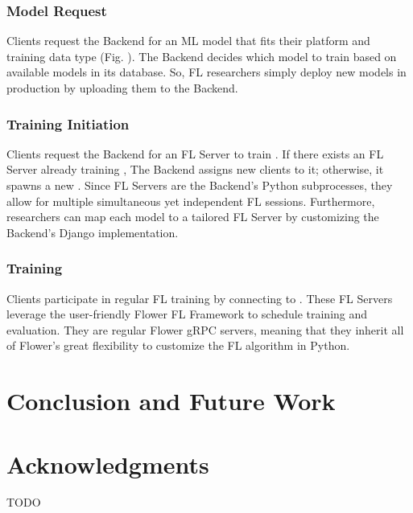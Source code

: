 \documentclass[letterpaper]{article} %
\begin{document}
\subsubsection{Model Request}
Clients request the Backend for an ML model \model{} that fits
their platform and training data type (Fig. ). %
The Backend decides which model to train based on
available models in its database.
So, FL researchers simply deploy new models in production by uploading them to
the Backend.

\subsubsection{Training Initiation}
Clients request the Backend for an FL Server \fs{} to train \model.
If there exists an FL Server already training \model,
The Backend assigns new clients to it;
otherwise, it spawns a new \fs.
Since FL Servers are the Backend's Python subprocesses,
they allow for multiple simultaneous yet independent FL sessions.
Furthermore, researchers can map each model to a tailored FL Server by
customizing the Backend's Django implementation.

\subsubsection{Training}
Clients participate in regular FL training by connecting to \fs.
These FL Servers leverage the user-friendly Flower FL Framework to
schedule training and evaluation.
They are regular Flower gRPC servers, meaning that
they inherit all of Flower's great flexibility to customize the FL algorithm in
Python.


\section{Conclusion and Future Work}


\appendix

\section*{Acknowledgments}
TODO

\bigskip


\end{document}
